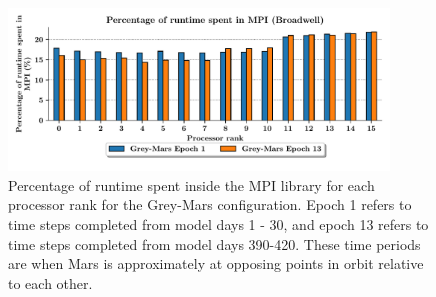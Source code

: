 \documentclass[a4paper,11pt]{report}
\begin{document}
\begin{figure}[htbp]
\begin{center}
\includegraphics[width=0.9\textwidth]{img/mpi-barrier-time-grey-mars.pdf}
\caption[Percentage of runtime spent in the MPI library]{Percentage of runtime spent inside the MPI library for each processor rank for the Grey-Mars configuration. Epoch 1 refers to time steps completed from model days 1 - 30, and epoch 13 refers to time steps completed from model days 390-420. These time periods are when Mars is approximately at opposing points in orbit relative to each other.}
\label{fig:grey-mars-comms}
\end{center}
\end{figure}
\end{document}

